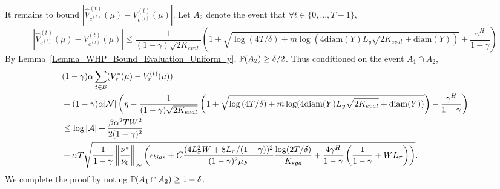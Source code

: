 It remains to bound $\left|\widehat V_{c^{(t)}}^{(t)}(\mu)-V_{c^{(t)}}^{(t)}(\mu)\right|$.
Let $A_2$ denote the event that $\forall t\in\{0,...,T-1\}$,
 $$
    \left|\widehat V_{c^{(t)}}^{(t)}(\mu)-V_{c^{(t)}}^{(t)}(\mu)\right|\leq \frac{1}{(1-\gamma)\sqrt{2K_{eval}}}\left(1+\sqrt{\log{(4T/\delta)}+m\log(4\mathrm{diam}(Y)L_y\sqrt{2K_{eval}}+\mathrm{diam}(Y))}+\frac{\gamma^H}{1-\gamma}\right)
    $$
By Lemma~\ref{Lemma_WHP_Bound_Evaluation_Uniform_y}, ${\mathbb P}(A_2)\geq \delta/2$.
Thus conditioned on the event $A_1\cap A_2$,
$$
\begin{aligned}
&(1-\gamma)\alpha\sum_{t\in {\mathcal{B}}} (V_r^*(\mu)-V_r^{(t)}(\mu))\\
&+(1-\gamma)\alpha|{\mathcal{N}}|\left(\eta-\frac{1}{(1-\gamma)\sqrt{2K_{eval}}}\left(1+\sqrt{\log{(4T/\delta)}+m\log(4\mathrm{diam}(Y)L_y\sqrt{2K_{eval}}+\mathrm{diam}(Y))}\right)-\frac{\gamma^H}{1-\gamma}\right)\\
&\leq \log|{\mathcal{A}}|+\frac{\beta\alpha^2 TW^2}{2(1-\gamma)^2}\\
&+\alpha T\sqrt{\frac{1}{1-\gamma}\left\|\frac{\nu^*}{\nu_0}\right\|_\infty\left(\epsilon_{bias}+C\frac{(4L_\pi^2W+8L_\pi/(1-\gamma))^2}{(1-\gamma)^2\mu_F}\frac{\log(2T/\delta)}{K_{sgd}}+\frac{4\gamma^H}{1-\gamma}\left(\frac{1}{1-\gamma}+WL_\pi\right)\right)}.
\end{aligned}
$$
We complete the proof by noting ${\mathbb P}(A_1\cap A_2)\geq 1-\delta$.
\endproof

